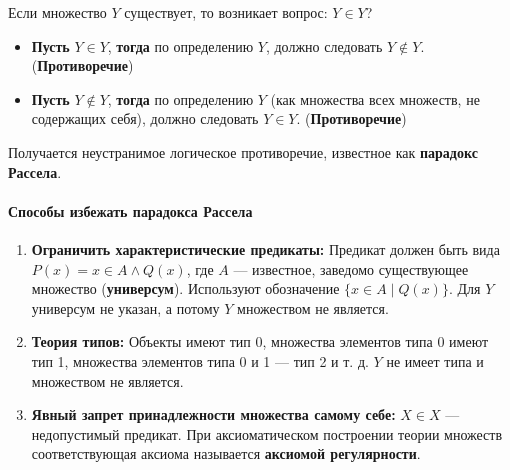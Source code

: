 Если множество $Y$ существует, то возникает вопрос: $Y \in Y$?
\begin{itemize}
    \item \textbf{Пусть} $Y \in Y$, \textbf{тогда} по определению $Y$, должно следовать $Y \notin Y$. (\textbf{Противоречие})
    \item \textbf{Пусть} $Y \notin Y$, \textbf{тогда} по определению $Y$ (как множества всех множеств, не содержащих себя), должно следовать $Y \in Y$. (\textbf{Противоречие})
\end{itemize}
Получается неустранимое логическое противоречие, известное как \textbf{парадокс Рассела}.

\paragraph{Способы избежать парадокса Рассела}
\begin{enumerate}
    \item \textbf{Ограничить характеристические предикаты:} Предикат должен быть вида $P(x) = x \in A \land Q(x)$, где $A$ --- известное, заведомо существующее множество (\textbf{универсум}). Используют обозначение $\{x \in A \mid Q(x)\}$. Для $Y$ универсум не указан, а потому $Y$ множеством не является.
    \item \textbf{Теория типов:} Объекты имеют тип 0, множества элементов типа 0 имеют тип 1, множества элементов типа 0 и 1 --- тип 2 и т. д. $Y$ не имеет типа и множеством не является.
    \item \textbf{Явный запрет принадлежности множества самому себе:} $X \in X$ --- недопустимый предикат. При аксиоматическом построении теории множеств соответствующая аксиома называется \textbf{аксиомой регулярности}.
\end{enumerate}

